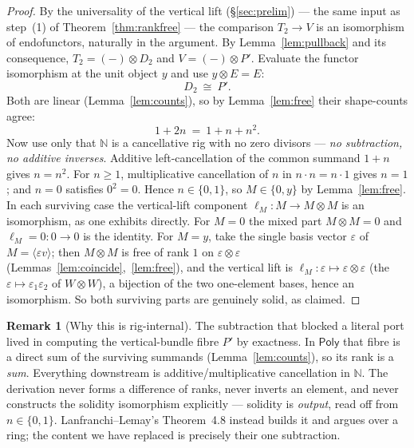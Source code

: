 \documentclass[11pt]{article}
\theoremstyle{definition}
\newtheorem{remark}[theorem]{Remark}
\newcommand{\Poly}{\mathsf{Poly}}
\newcommand{\N}{\mathbb{N}}
\begin{document}
\begin{proof}
By the universality of the vertical lift (\S\ref{sec:prelim}) --- the same input as step~(1) of
Theorem~\ref{thm:rankfree} --- the comparison $T_2\to V$ is an isomorphism of endofunctors, naturally
in the argument. By Lemma~\ref{lem:pullback} and its
consequence, $T_2=(-)\otimes D_2$ and $V=(-)\otimes P'$. Evaluate the functor isomorphism at the
unit object $y$ and use $y\otimes E=E$:
\[
  D_2\ \cong\ P'.
\]
Both are linear (Lemma~\ref{lem:counts}), so by Lemma~\ref{lem:free} their shape-counts agree:
\[
  1+2n\ =\ 1+n+n^2.
\]
Now use only that $\N$ is a cancellative rig with no zero divisors --- \emph{no subtraction, no
additive inverses}. Additive left-cancellation of the common summand $1+n$ gives $n=n^2$. For
$n\ge1$, multiplicative cancellation of $n$ in $n\cdot n=n\cdot1$ gives $n=1$; and $n=0$ satisfies
$0^2=0$. Hence $n\in\{0,1\}$, so $M\in\{0,y\}$ by Lemma~\ref{lem:free}. In each surviving case the
vertical-lift component $\ell_M\colon M\to M\otimes M$ is an isomorphism, as one exhibits directly.
For $M=0$ the mixed part $M\otimes M=0$ and $\ell_M=0\colon 0\to 0$ is the identity. For $M=y$, take
the single basis vector $\varepsilon$ of $M=\langle\varepsilon v\rangle$; then $M\otimes M$ is free of
rank $1$ on $\varepsilon\otimes\varepsilon$ (Lemmas~\ref{lem:coincide},~\ref{lem:free}), and the
vertical lift is $\ell_M\colon\varepsilon\mapsto\varepsilon\otimes\varepsilon$ (the
$\varepsilon\mapsto\varepsilon_1\varepsilon_2$ of $W\otimes W$), a bijection of the two one-element
bases, hence an isomorphism. So both surviving parts are genuinely solid, as claimed.
\end{proof}

\begin{remark}[Why this is rig-internal]
The subtraction that blocked a literal port lived in computing the vertical-bundle fibre $P'$ by
exactness. In $\Poly$ that fibre is a direct sum of the surviving summands
(Lemma~\ref{lem:counts}), so its rank is a \emph{sum}. Everything downstream is
additive/multiplicative cancellation in $\N$. The derivation never forms a difference of ranks,
never inverts an element, and never constructs the solidity isomorphism explicitly --- solidity is
\emph{output}, read off from $n\in\{0,1\}$. Lanfranchi--Lemay's Theorem~4.8 instead builds it and
argues over a ring; the content we have replaced is precisely their one subtraction.
\end{remark}
\end{document}
